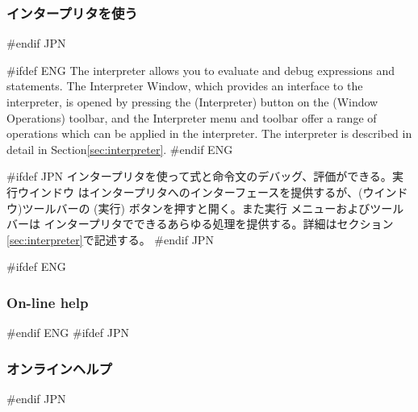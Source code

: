\documentclass[\pformat,12pt]{article}
\newcommand{\Toolbox}{Toolbox}
\newcommand{\Toolbox}{Toolbox}
\newcommand{\guicmd}[1]{{\sf #1}}
\newcommand{\guicmd}[1]{{\gt #1}}
\begin{document}
\subsubsection{インタープリタを使う}
#endif JPN

#ifdef ENG
The interpreter allows you to evaluate and debug expressions and
statements. The \guicmd{Interpreter Window}, which provides an
interface to the interpreter, is opened by pressing the 
(\guicmd{Interpreter}) button on the (\guicmd{Window Operations})
toolbar, and the \guicmd{Interpreter} menu and toolbar offer a range
of operations which can be applied in the interpreter. The interpreter
is described in detail in Section\ref{sec:interpreter}.
#endif ENG

#ifdef JPN
インタープリタを使って式と命令文のデバッグ、評価ができる。\guicmd{実行ウインドウ}
はインタープリタへのインターフェースを提供するが、(\guicmd{ウインドウ})ツールバーの 
(\guicmd{実行}) ボタンを押すと開く。また\guicmd{実行} メニューおよびツールバーは
インタープリタでできるあらゆる処理を提供する。詳細はセクション\ref{sec:interpreter}で記述する。
#endif JPN

#ifdef ENG
\subsubsection{On-line help}
#endif ENG
#ifdef JPN
\subsubsection{オンラインヘルプ}
#endif JPN
% 
%
\end{document}
